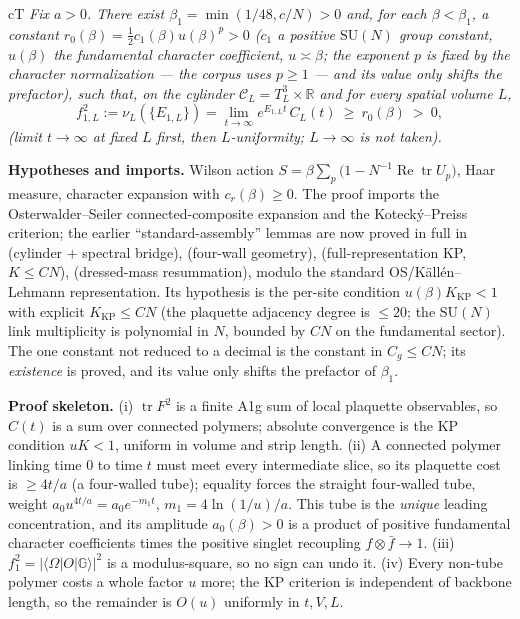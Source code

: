\begin{claimbox}{cT}
 \emph{Fix $a>0$. There exist $\beta_1=\min(1/48,c/N)>0$ and, for
each $\beta<\beta_1$, a constant $r_0(\beta)=\tfrac12 c_1(\beta)u(\beta)^p>0$ ($c_1$ a positive
$\mathrm{SU}(N)$ group constant, $u(\beta)$ the fundamental character coefficient,
$u\asymp\beta$; the exponent $p$ is fixed by the character normalization --- the corpus uses
$p\ge1$ --- and its value only shifts the prefactor), such that, on the cylinder $\mathcal C_L=T^3_L\times\mathbb R$ and for every spatial volume $L$,}
\begin{equation}
f_{1,L}^2:=\nu_L(\{E_{1,L}\})=\lim_{t\to\infty}e^{E_{1,L}t}\,C_L(t)\ \ge\ r_0(\beta)\ >\ 0,
\label{eq:p3}
\end{equation}
\emph{(limit $t\to\infty$ at fixed $L$ first, then $L$-uniformity; $L\to\infty$ is not taken).}

\smallskip
\textbf{Hypotheses and imports.} Wilson action $S=\beta\sum_p\bigl(1-N^{-1}\operatorname{Re}
\operatorname{tr}U_p\bigr)$, Haar measure, character expansion with $c_r(\beta)\ge0$. The proof
imports the Osterwalder--Seiler connected-composite expansion and the Kotecký--Preiss criterion;
the earlier ``standard-assembly'' lemmas are now proved in full in  (cylinder $+$ spectral bridge),  (four-wall geometry),  (full-representation KP, $K\le CN$),  (dressed-mass resummation), modulo the standard OS/Källén--Lehmann representation.
Its hypothesis is the per-site condition $u(\beta)K_{\mathrm{KP}}<1$ with explicit $K_{\mathrm{KP}}\le CN$ (the plaquette
adjacency degree is $\le20$; the $\mathrm{SU}(N)$ link multiplicity is polynomial in $N$,
bounded by $CN$ on the fundamental sector). The one constant not reduced to a decimal is the
constant in $C_g\le CN$; its \emph{existence} is proved, and its value only shifts the prefactor
of $\beta_1$.

\smallskip
\textbf{Proof skeleton.} (i) $\operatorname{tr}F^2$ is a finite A1g sum of local plaquette
observables, so $C(t)$ is a sum over connected polymers; absolute convergence is the KP
condition $uK<1$, uniform in volume and strip length. (ii) A connected polymer linking time $0$
to time $t$ must meet every intermediate slice, so its plaquette cost is $\ge 4t/a$ (a four-walled tube); equality
forces the straight four-walled tube, weight $a_0u^{4t/a}=a_0e^{-m_1t}$, $m_1=4\ln(1/u)/a$. This tube is the
\emph{unique} leading concentration, and its amplitude $a_0(\beta)>0$ is a product of positive
fundamental character coefficients times the positive singlet recoupling
$f\otimes\bar f\to1$. (iii) $f_1^2=|\langle\Omega|O|\mathbb{G}\rangle|^2$ is a modulus-square, so no sign
can undo it. (iv) Every non-tube polymer costs a whole factor $u$ more; the KP criterion is
independent of backbone length, so the remainder is $O(u)$ uniformly in $t,V,L$.


\end{claimbox}
